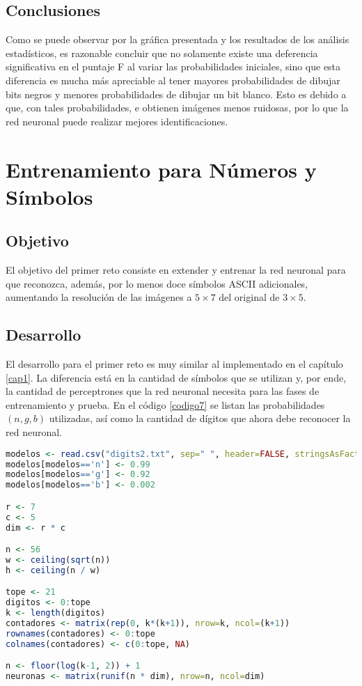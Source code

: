 \documentclass{report}
\begin{document}
\newpage

\section{Conclusiones}

Como se puede observar por la gr\'afica presentada y los resultados de los an\'alisis estad\'isticos, es razonable concluir que no solamente existe una deferencia significativa en el puntaje F al variar las probabilidades iniciales, sino que esta diferencia es mucha m\'as apreciable al tener mayores probabilidades de dibujar bits negros y menores probabilidades de dibujar un bit blanco. Esto es debido a que, con tales probabilidades, e obtienen im\'agenes menos ruidosas, por lo que la red neuronal puede realizar mejores identificaciones.

\chapter{Entrenamiento para N\'umeros y S\'imbolos}

\section{Objetivo}

El objetivo del primer reto consiste en extender y entrenar la red neuronal para que reconozca, además,  por lo menos doce símbolos ASCII adicionales, aumentando la resolución de las imágenes a $5\times7$ del original de $3\times5$.

\section{Desarrollo}
El desarrollo para el primer reto es muy similar al implementado en el cap\'itulo \ref{cap1}. La diferencia est\'a en la cantidad de s\'imbolos que se utilizan y, por ende, la cantidad de perceptrones que la red neuronal necesita para las fases de entrenamiento y prueba. En el c\'odigo \ref{codigo7} se listan las probabilidades $(n, g, b)$ utilizadas, as\'i como la cantidad de d\'igitos que ahora debe reconocer la red neuronal.

\begin{lstlisting}[caption=Nuevos Par\'ametros de Operaci\'on, label=codigo7, language=R]
modelos <- read.csv("digits2.txt", sep=" ", header=FALSE, stringsAsFactors=F)
modelos[modelos=='n'] <- 0.99
modelos[modelos=='g'] <- 0.92
modelos[modelos=='b'] <- 0.002

r <- 7
c <- 5
dim <- r * c

n <- 56
w <- ceiling(sqrt(n))
h <- ceiling(n / w)

tope <- 21
digitos <- 0:tope
k <- length(digitos)
contadores <- matrix(rep(0, k*(k+1)), nrow=k, ncol=(k+1))
rownames(contadores) <- 0:tope
colnames(contadores) <- c(0:tope, NA)

n <- floor(log(k-1, 2)) + 1
neuronas <- matrix(runif(n * dim), nrow=n, ncol=dim)
\end{lstlisting}
\end{document}
